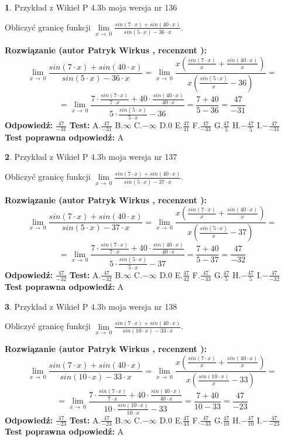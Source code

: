\documentclass[12pt, a4paper]{article}
\theoremstyle{definition} %
\newtheorem{zad}{}
\newcommand{\zadStart}[1]{\begin{zad}#1\newline}
\newcommand{\zadStop}{\end{zad}}
\newcommand{\rozwStart}[2]{\noindent \textbf{Rozwiązanie (autor #1 , recenzent #2): }\newline}
\newcommand{\rozwStop}{\newline}
\newcommand{\odpStart}{\noindent \textbf{Odpowiedź:}\newline}
\newcommand{\odpStop}{\newline}
\newcommand{\testStart}{\noindent \textbf{Test:}\newline}
\newcommand{\testStop}{\newline}
\newcommand{\kluczStart}{\noindent \textbf{Test poprawna odpowiedź:}\newline}
\newcommand{\kluczStop}{\newline}
\begin{document}
\zadStart{Przykład z Wikieł P 4.3b moja wersja nr 136}


Obliczyć granicę funkcji $\lim\limits_{x\to\ 0}\frac{sin(7 \cdot x)+sin(40 \cdot x)}{sin(5 \cdot x)-36 \cdot x}$.
\zadStop
\rozwStart{Patryk Wirkus}{}
$$\lim\limits_{x\to\ 0}\frac{sin(7 \cdot x)+sin(40 \cdot x)}{sin(5 \cdot x)-36 \cdot x}=\lim\limits_{x\to\ 0}\frac{x(\frac{sin(7 \cdot x)}{x}+\frac{sin(40 \cdot x)}{x})}{x(\frac{sin(5 \cdot x)}{x}-36)}=$$
$$=\lim\limits_{x\to\ 0}\frac{7 \cdot \frac{sin(7 \cdot x)}{7 \cdot x}+40 \cdot \frac{sin(40 \cdot x)}{40 \cdot x}}{5 \cdot \frac{sin(5 \cdot x)}{5 \cdot x}-36}=\frac{7+40}{5-36} = \frac{47}{-31}$$
\rozwStop
\odpStart
$\frac{47}{-31}$
\odpStop
\testStart
A.$\frac{47}{-31}$
B.$\infty$
C.$-\infty$
D.$0$
E.$\frac{47}{41}$
F.$\frac{47}{-33}$
G.$\frac{47}{5}$
H.$-\frac{47}{5}$
I.$-\frac{47}{-31}$
\testStop
\kluczStart
A
\kluczStop



\zadStart{Przykład z Wikieł P 4.3b moja wersja nr 137}


Obliczyć granicę funkcji $\lim\limits_{x\to\ 0}\frac{sin(7 \cdot x)+sin(40 \cdot x)}{sin(5 \cdot x)-37 \cdot x}$.
\zadStop
\rozwStart{Patryk Wirkus}{}
$$\lim\limits_{x\to\ 0}\frac{sin(7 \cdot x)+sin(40 \cdot x)}{sin(5 \cdot x)-37 \cdot x}=\lim\limits_{x\to\ 0}\frac{x(\frac{sin(7 \cdot x)}{x}+\frac{sin(40 \cdot x)}{x})}{x(\frac{sin(5 \cdot x)}{x}-37)}=$$
$$=\lim\limits_{x\to\ 0}\frac{7 \cdot \frac{sin(7 \cdot x)}{7 \cdot x}+40 \cdot \frac{sin(40 \cdot x)}{40 \cdot x}}{5 \cdot \frac{sin(5 \cdot x)}{5 \cdot x}-37}=\frac{7+40}{5-37} = \frac{47}{-32}$$
\rozwStop
\odpStart
$\frac{47}{-32}$
\odpStop
\testStart
A.$\frac{47}{-32}$
B.$\infty$
C.$-\infty$
D.$0$
E.$\frac{47}{42}$
F.$\frac{47}{-33}$
G.$\frac{47}{5}$
H.$-\frac{47}{5}$
I.$-\frac{47}{-32}$
\testStop
\kluczStart
A
\kluczStop



\zadStart{Przykład z Wikieł P 4.3b moja wersja nr 138}


Obliczyć granicę funkcji $\lim\limits_{x\to\ 0}\frac{sin(7 \cdot x)+sin(40 \cdot x)}{sin(10 \cdot x)-33 \cdot x}$.
\zadStop
\rozwStart{Patryk Wirkus}{}
$$\lim\limits_{x\to\ 0}\frac{sin(7 \cdot x)+sin(40 \cdot x)}{sin(10 \cdot x)-33 \cdot x}=\lim\limits_{x\to\ 0}\frac{x(\frac{sin(7 \cdot x)}{x}+\frac{sin(40 \cdot x)}{x})}{x(\frac{sin(10 \cdot x)}{x}-33)}=$$
$$=\lim\limits_{x\to\ 0}\frac{7 \cdot \frac{sin(7 \cdot x)}{7 \cdot x}+40 \cdot \frac{sin(40 \cdot x)}{40 \cdot x}}{10 \cdot \frac{sin(10 \cdot x)}{10 \cdot x}-33}=\frac{7+40}{10-33} = \frac{47}{-23}$$
\rozwStop
\odpStart
$\frac{47}{-23}$
\odpStop
\testStart
A.$\frac{47}{-23}$
B.$\infty$
C.$-\infty$
D.$0$
E.$\frac{47}{43}$
F.$\frac{47}{-33}$
G.$\frac{47}{10}$
H.$-\frac{47}{10}$
I.$-\frac{47}{-23}$
\testStop
\kluczStart
A
\kluczStop
\end{document}
